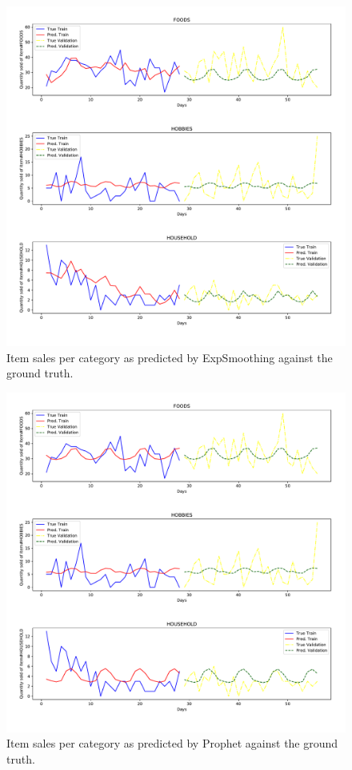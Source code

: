 \documentclass[12pt]{article}
\begin{document}
\begin{figure}[H]
  \centering
  \includegraphics[width=.8\linewidth]{exp-sm-cat}
  \caption{Item sales per category as predicted by ExpSmoothing against the ground truth.}
  \label{fig:expsm-category-sales}
\end{figure}

\begin{figure}[H]
  \centering
  \includegraphics[width=.8\linewidth]{pro-cat}
  \caption{Item sales per category as predicted by Prophet against the ground truth.}
  \label{fig:pro-category-sales}
\end{figure}
\end{document}
